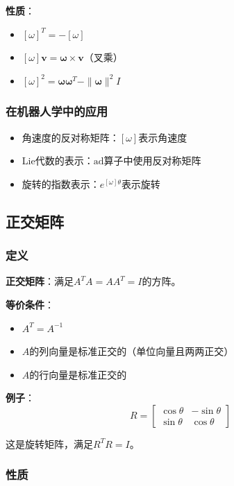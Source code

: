 \documentclass[12pt,a4paper]{article}
\begin{document}
\textbf{性质}：
\begin{itemize}
\item $[\omega]^T = -[\omega]$
\item $[\omega] \bm{v} = \bm{\omega} \times \bm{v}$（叉乘）
\item $[\omega]^2 = \bm{\omega} \bm{\omega}^T - \|\bm{\omega}\|^2 I$
\end{itemize}

\subsubsection{在机器人学中的应用}

\begin{itemize}
\item 角速度的反对称矩阵：$[\omega]$表示角速度
\item Lie代数的表示：$\text{ad}$算子中使用反对称矩阵
\item 旋转的指数表示：$e^{[\omega]\theta}$表示旋转
\end{itemize}

\subsection{正交矩阵}

\subsubsection{定义}

\textbf{正交矩阵}：满足$A^T A = AA^T = I$的方阵。

\textbf{等价条件}：
\begin{itemize}
\item $A^T = A^{-1}$
\item $A$的列向量是标准正交的（单位向量且两两正交）
\item $A$的行向量是标准正交的
\end{itemize}

\textbf{例子}：
\begin{equation}
R = \begin{bmatrix} \cos\theta & -\sin\theta \\ \sin\theta & \cos\theta \end{bmatrix}
\end{equation}

这是旋转矩阵，满足$R^T R = I$。

\subsubsection{性质}
\end{document}
